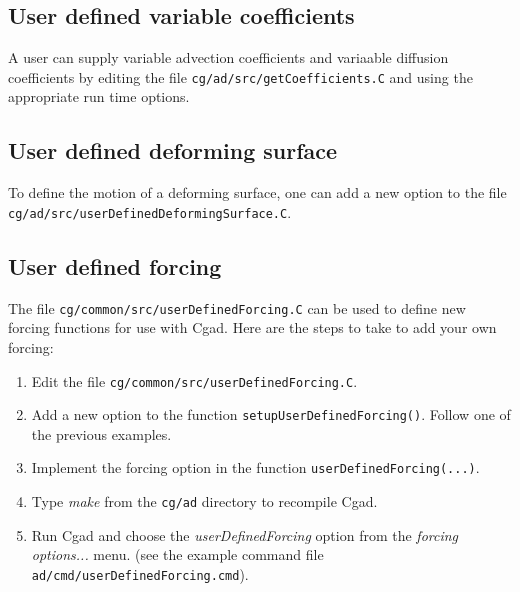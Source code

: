 \documentclass[10pt]{article}
\begin{document}
\clearpage
\subsection{User defined variable coefficients} \label{sec:userDefinedVariableCoefficients}

A user can supply variable advection coefficients and variaable diffusion coefficients
by editing the file {\tt cg/ad/src/getCoefficients.C} and using the appropriate
run time options. 


\subsection{User defined deforming surface} \label{sec:userDefinedDeformingSurface}

To define the motion of a deforming surface, one can add a new option to the
file {\tt cg/ad/src/userDefinedDeformingSurface.C}. 



\subsection{User defined forcing} \label{sec:userDefinedForcing}


The file {\tt cg/common/src/userDefinedForcing.C} can be used to define new forcing functions
for use with Cgad. Here are the steps to take to add your own forcing:
\begin{enumerate}
  \item Edit the file  {\tt cg/common/src/userDefinedForcing.C}.
  \item Add a new option to the function {\tt setupUserDefinedForcing()}. Follow one of the previous
         examples. 
  \item Implement the forcing option in the function {\tt userDefinedForcing(...)}.
  \item Type {\em make} from the {\tt cg/ad} directory to recompile Cgad.
  \item Run Cgad and choose the {\em userDefinedForcing} option from the {\em forcing options...} menu.
    (see the example command file {\tt ad/cmd/userDefinedForcing.cmd}).
\end{enumerate}
\end{document}
